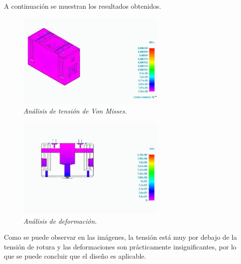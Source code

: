 A continuación se muestran los resultados obtenidos. \\
\begin{figure}[H]
    \centering
\includegraphics[width=0.65\textwidth]{img/completo_sin_mallar.jpg} \par
    \caption{\textit{Análisis de tensión de Von Misses.}}
    \label{fig:sup_analisis_tension}
\end{figure} 
\begin{figure}[H]
    \centering
\includegraphics[width=0.65\textwidth]{img/Corte_transv_sin_mallado_def.jpg} \par
    \caption{\textit{Análisis de deformación.}}
    \label{fig:sup_analisis_def}
\end{figure}
Como se puede observar en las imágenes, la tensión está muy por debajo de la tensión de rotura y las deformaciones son prácticamente insignificantes, por lo que se puede concluir que el diseño es aplicable.\\


